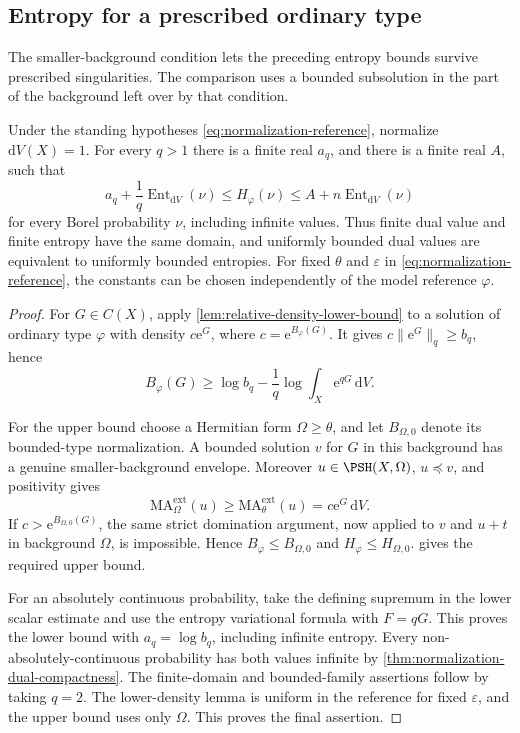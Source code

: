 \subsection{Entropy for a prescribed ordinary type}

The smaller-background condition lets the preceding entropy bounds survive prescribed singularities. The comparison uses a bounded subsolution in the part of the background left over by that condition.

\begin{corollary}\label{cor:prescribed-dual-entropy}
Under the standing hypotheses \eqref{eq:normalization-reference}, normalize $\mathrm{d}V(X)=1$. For every $q>1$ there is a finite real $a_q$, and there is a finite real $A$, such that
\[
 a_q+\frac1q\operatorname{Ent}_{\mathrm{d}V}(\nu)
 \leq H_\varphi(\nu)
 \leq A+n\operatorname{Ent}_{\mathrm{d}V}(\nu)
\]
for every Borel probability $\nu$, including infinite values. Thus finite dual value and finite entropy have the same domain, and uniformly bounded dual values are equivalent to uniformly bounded entropies. For fixed $\theta$ and $\varepsilon$ in \eqref{eq:normalization-reference}, the constants can be chosen independently of the model reference $\varphi$.
\end{corollary}
\begin{proof}
For $G\in C(X)$, apply \cref{lem:relative-density-lower-bound} to a solution of ordinary type $\varphi$ with density $c\mathrm{e}^G$, where $c=\mathrm{e}^{B_\varphi(G)}$. It gives $c\|\mathrm{e}^G\|_q\geq b_q$, hence
\[
 B_\varphi(G)\geq\log b_q-\frac1q
                         \log\int_X\mathrm{e}^{qG}\,\mathrm{d}V.
\]

For the upper bound choose a Hermitian form $\Omega\geq\theta$, and let $B_{\Omega,0}$ denote its bounded-type normalization. A bounded solution $v$ for $G$ in this background has a genuine smaller-background envelope. Moreover $u\in\PSH(X,\Omega)$, $u\preceq v$, and positivity gives
\[
 \mathrm{MA}^{\mathrm{ext}}_\Omega(u)
       \geq\mathrm{MA}^{\mathrm{ext}}_\theta(u)
       =c\mathrm{e}^G\,\mathrm{d}V.
\]
If $c>\mathrm{e}^{B_{\Omega,0}(G)}$, the same strict domination argument, now applied to $v$ and $u+t$ in background $\Omega$, is impossible. Hence $B_\varphi\leq B_{\Omega,0}$ and $H_\varphi\leq H_{\Omega,0}$.  gives the required upper bound.

For an absolutely continuous probability, take the defining supremum in the lower scalar estimate and use the entropy variational formula with $F=qG$. This proves the lower bound with $a_q=\log b_q$, including infinite entropy. Every non-absolutely-continuous probability has both values infinite by \cref{thm:normalization-dual-compactness}. The finite-domain and bounded-family assertions follow by taking $q=2$. The lower-density lemma is uniform in the reference for fixed $\varepsilon$, and the upper bound uses only $\Omega$. This proves the final assertion.
\end{proof}

